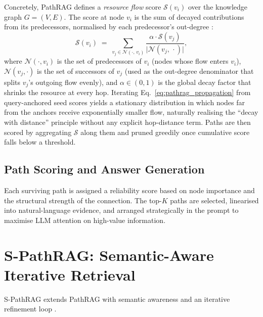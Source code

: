 \documentclass[12pt,a4paper,oneside]{report}
\begin{document}
Concretely, PathRAG defines a \emph{resource flow} score
$\mathcal{S}(v_i)$ over the knowledge graph $G = (V, E)$. The score
at node $v_i$ is the sum of decayed contributions from its
predecessors, normalised by each predecessor's out-degree
\citep{chen2025pathrag}:
\begin{equation}
    \mathcal{S}(v_i) \;=\; \sum_{v_j \in \mathcal{N}(\cdot,\, v_i)}
    \frac{\alpha \cdot \mathcal{S}(v_j)}{\bigl|\mathcal{N}(v_j,\,\cdot)\bigr|},
    \label{eq:pathrag_propagation}
\end{equation}
where $\mathcal{N}(\cdot, v_i)$ is the set of predecessors of
$v_i$ (nodes whose flow enters $v_i$), $\mathcal{N}(v_j, \cdot)$ is
the set of successors of $v_j$ (used as the out-degree
denominator that splits $v_j$'s outgoing flow evenly), and
$\alpha \in (0, 1)$ is the global decay factor that shrinks
the resource at every hop. Iterating
Eq.~\eqref{eq:pathrag_propagation} from query-anchored seed scores
yields a stationary distribution in which nodes far from the
anchors receive exponentially smaller flow, naturally realising the
``decay with distance'' principle without any explicit hop-distance
term. Paths are then scored by aggregating $\mathcal{S}$ along them
and pruned greedily once cumulative score falls below a threshold.

\subsection{Path Scoring and Answer Generation}
Each surviving path is assigned a reliability score based on node importance
and the structural strength of the connection. The top-$K$ paths are
selected, linearised into natural-language evidence, and arranged
strategically in the prompt to maximise LLM attention on high-value
information.

\section{S-PathRAG: Semantic-Aware Iterative Retrieval}

S-PathRAG extends PathRAG with semantic awareness and an iterative refinement
loop \citep{fu2026spathrag}.
\end{document}
